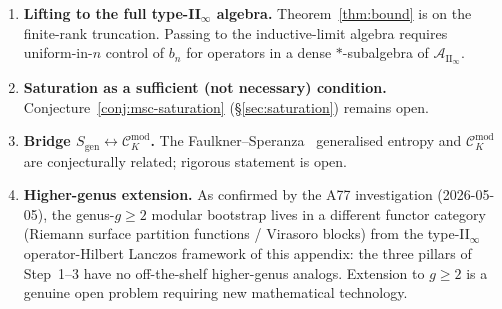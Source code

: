 \documentclass[12pt,a4paper]{article}
\begin{document}
\begin{enumerate}
\item \textbf{Lifting to the full type-II$_\infty$ algebra.}
Theorem~\ref{thm:bound} is on the finite-rank truncation.
Passing to the inductive-limit algebra requires uniform-in-$n$ control
of $b_n$ for operators in a dense $\ast$-subalgebra of
$\mathcal{A}_{\mathrm{II}_\infty}$.

\item \textbf{Saturation as a sufficient (not necessary) condition.}
Conjecture~\ref{conj:msc-saturation} (\S\ref{sec:saturation}) remains
open.

\item \textbf{Bridge $S_{\mathrm{gen}} \leftrightarrow
\mathcal{C}_K^{\mathrm{mod}}$.}
The Faulkner--Speranza~\cite{FaulknerSperanza2024} generalised entropy
and $\mathcal{C}_K^{\mathrm{mod}}$ are conjecturally related; rigorous
statement is open.

\item \textbf{Higher-genus extension.}
As confirmed by the A77 investigation (2026-05-05), the genus-$g \ge 2$
modular bootstrap lives in a different functor category (Riemann surface
partition functions / Virasoro blocks) from the type-II$_\infty$
operator-Hilbert Lanczos framework of this appendix: the three pillars of
Step~1--3 have no off-the-shelf higher-genus analogs. Extension to $g \ge 2$
is a genuine open problem requiring new mathematical technology.
\end{enumerate}
\end{document}
